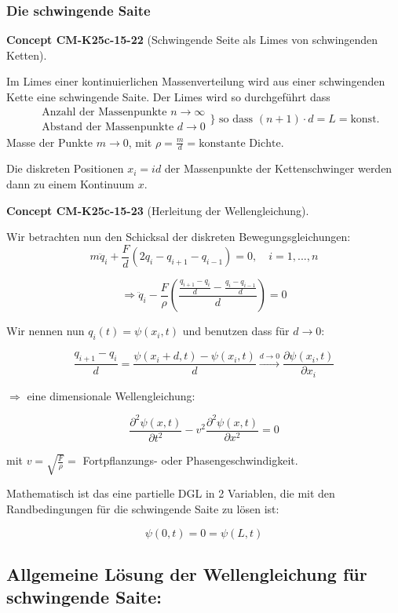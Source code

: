 \documentclass[10pt, letterpaper]{article}
\newcommand{\CustomHeading}[3]{%
  \par\medskip\noindent%
  \textbf{#1 #2} \textnormal{(#3)}.\enskip%
}
\newenvironment{CONC}[2]{\begin{unitbox}\CustomHeading{Concept}{#1}{#2}}{\end{unitbox}}
\begin{document}
\pagebreak


\subsubsection{Die schwingende Saite}


\begin{CONC}{CM-K25c-15-22}{Schwingende Seite als Limes von schwingenden Ketten}
Im Limes einer kontinuierlichen Massenverteilung wird aus einer schwingenden Kette eine schwingende Saite. Der Limes wird so durchgeführt dass
\[
\begin{aligned}
&\text{Anzahl der Massenpunkte } n \to \infty \\
&\text{Abstand der Massenpunkte } d \to 0 
\end{aligned}
\} \text{ so dass } (n+1)\cdot d = L = \text{konst.}
\]
Masse der Punkte $m \to 0$, mit $\rho = \frac{m}{d} = \text{konstante Dichte}$.

Die diskreten Positionen $x_i = id$ der Massenpunkte der Kettenschwinger werden dann zu einem Kontinuum $x$.
\end{CONC} 

\begin{CONC}{CM-K25c-15-23}{Herleitung der Wellengleichung}
Wir betrachten nun den Schicksal der diskreten Bewegungsgleichungen:
\[
m\ddot{q}_i + \frac{F}{d}(2q_i - q_{i+1} - q_{i-1}) = 0, \quad i=1,...,n
\]

\[
\Rightarrow \ddot{q}_i - \frac{F}{\rho}\left(\frac{\frac{q_{i+1}-q_i}{d} - \frac{q_i-q_{i-1}}{d}}{d}\right) = 0
\]

Wir nennen nun $q_i(t) = \psi(x_i,t)$ und benutzen dass für $d \to 0$:

\[
\frac{q_{i+1}-q_i}{d} = \frac{\psi(x_i+d,t) - \psi(x_i,t)}{d} \xrightarrow{d\to 0} \frac{\partial\psi(x_i,t)}{\partial x_i}
\]

$\Rightarrow$ eine dimensionale Wellengleichung:

\[
\frac{\partial^2\psi(x,t)}{\partial t^2} - v^2\frac{\partial^2\psi(x,t)}{\partial x^2} = 0
\]

mit $v = \sqrt{\frac{F}{\rho}} = $ Fortpflanzungs- oder Phasengeschwindigkeit.

Mathematisch ist das eine partielle DGL in 2 Variablen, die mit den Randbedingungen für die schwingende Saite zu lösen ist:

\[
\psi(0,t) = 0 = \psi(L,t)
\]
\end{CONC}


\subsection*{Allgemeine Lösung der Wellengleichung für schwingende Saite:}
\end{document}
